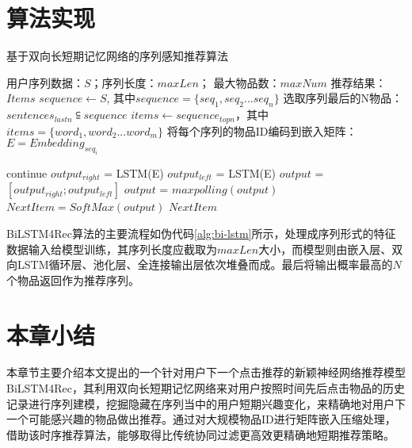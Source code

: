 \section{算法实现}
\begin{algorithm}[htbp]
	\caption{基于双向长短期记忆网络的序列感知推荐算法}
	\label{alg:bi-lstm}
		\begin{algorithmic}[1]
			\REQUIRE 用户序列数据：$S$；序列长度：$maxLen$； 最大物品数：$maxNum$
			\ENSURE 推荐结果：$Items$
			\STATE $sequence \leftarrow S$, 其中$sequence=\{seq_{1}, seq_{2}...seq_{n}\}$
				\STATE 选取序列最后的N物品：$sentences_{lastn} \subseteqq sequence$
			  	\STATE $items \leftarrow sequence_{topn}$，其中 $items=\{word_{1}, word_{2}...word_{m}\}$
			    \STATE 将每个序列的物品ID编码到嵌入矩阵：$E = Embedding_{seq_{i}}$
			  \ENDFOR
			  
			\ELSE
				\STATE continue
			\ENDIF
				\STATE $output_{right}$ = LSTM(E)
				\ENDFOR
				\STATE $output_{left}$ = LSTM(E)
				\ENDFOR
			\STATE $output$ = $[output_{right}; output_{left}]$
			\STATE $output$ = $maxpolling(output)$
			\STATE $NextItem = SoftMax(output) $
			\RETURN $NextItem$
		\end{algorithmic}
\end{algorithm}
BiLSTM4Rec算法的主要流程如伪代码\ref{alg:bi-lstm}所示，处理成序列形式的特征数据输入给模型训练，其序列长度应截取为$maxLen$大小，而模型则由嵌入层、双向LSTM循环层、池化层、全连接输出层依次堆叠而成。最后将输出概率最高的$N$个物品返回作为推荐序列。
\section{本章小结}

本章节主要介绍本文提出的一个针对用户下一个点击推荐的新颖神经网络推荐模型BiLSTM4Rec，其利用双向长短期记忆网络来对用户按照时间先后点击物品的历史记录进行序列建模，挖掘隐藏在序列当中的用户短期兴趣变化，来精确地对用户下一个可能感兴趣的物品做出推荐。通过对大规模物品ID进行矩阵嵌入压缩处理，借助该时序推荐算法，能够取得比传统协同过滤更高效更精确地短期推荐策略。

